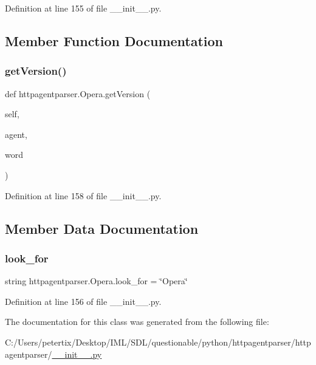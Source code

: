 Definition at line 155 of file \+\_\+\+\_\+init\+\_\+\+\_\+.\+py.



\subsection{Member Function Documentation}
\hypertarget{classhttpagentparser_1_1_opera_a58e4d1290d7e259160b5161dd0049983}{}\label{classhttpagentparser_1_1_opera_a58e4d1290d7e259160b5161dd0049983} 
\subsubsection{\texorpdfstring{get\+Version()}{getVersion()}}
{\footnotesize\ttfamily def httpagentparser.\+Opera.\+get\+Version (\begin{DoxyParamCaption}\item[{}]{self,  }\item[{}]{agent,  }\item[{}]{word }\end{DoxyParamCaption})}



Definition at line 158 of file \+\_\+\+\_\+init\+\_\+\+\_\+.\+py.



\subsection{Member Data Documentation}
\hypertarget{classhttpagentparser_1_1_opera_a0320f569a76d967cb09efda1885499a5}{}\label{classhttpagentparser_1_1_opera_a0320f569a76d967cb09efda1885499a5} 
\subsubsection{\texorpdfstring{look\+\_\+for}{look\_for}}
{\footnotesize\ttfamily string httpagentparser.\+Opera.\+look\+\_\+for = \char`\"{}Opera\char`\"{}\hspace{0.3cm}{\ttfamily [static]}}



Definition at line 156 of file \+\_\+\+\_\+init\+\_\+\+\_\+.\+py.



The documentation for this class was generated from the following file\+:\begin{DoxyCompactItemize}
\item 
C\+:/\+Users/petertix/\+Desktop/\+I\+M\+L/\+S\+D\+L/questionable/python/httpagentparser/httpagentparser/\hyperlink{____init_____8py}{\+\_\+\+\_\+init\+\_\+\+\_\+.\+py}\end{DoxyCompactItemize}
